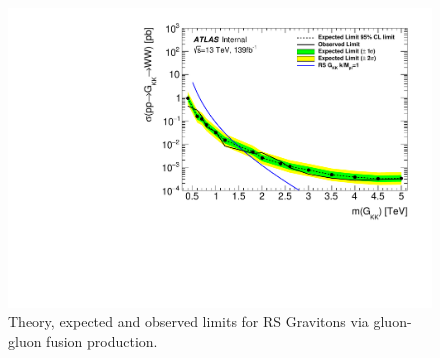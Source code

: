 \begin{figure}[h!]
  \centering
  \includegraphics[width=\hsize]{figures/results/limits/limits_rsg.pdf}

 \caption{Theory, expected and observed limits for RS Gravitons via gluon-gluon fusion production.}
  \label{fig:rsg_limit}
\end{figure} 
\FloatBarrier
